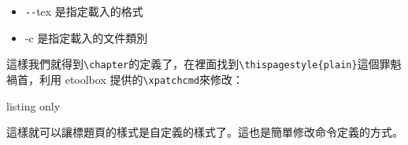 \begin{itemize}
\item \verb`--`tex 是指定載入的格式
\item -c 是指定載入的文件類別
\end{itemize}

這樣我們就得到\verb|\chapter|的定義了，在裡面找到\verb|\thispagestyle{plain}|這個罪魁禍首，利用 etoolbox 提供的\verb|\xpatchcmd|來修改：

\begin{tcblisting}{listing only}
\xpatchcmd{\chapter}{\thispagestyle{plain}}{ }{ }{ }
\end{tcblisting}

這樣就可以讓標題頁的樣式是自定義的樣式了。這也是簡單修改命令定義的方式。